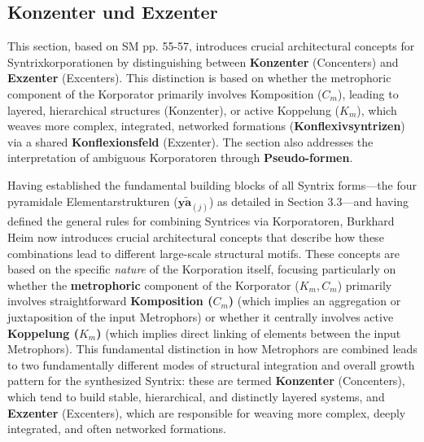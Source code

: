 \documentclass[12pt]{article}
\newcommand{\elementarstruktur}{\bm{y\widetilde{a}}_{(j)}}
\begin{document}
\subsection{Konzenter und Exzenter}
\label{sec:konzenter_exzenter}

This section, based on SM pp. 55-57, introduces crucial architectural concepts for Syntrixkorporationen by distinguishing between \textbf{Konzenter} (Concenters) and \textbf{Exzenter} (Excenters). This distinction is based on whether the metrophoric component of the Korporator primarily involves Komposition (\(C_m\)), leading to layered, hierarchical structures (Konzenter), or active Koppelung (\(K_m\)), which weaves more complex, integrated, networked formations (\textbf{Konflexivsyntrizen}) via a shared \textbf{Konflexionsfeld} (Exzenter). The section also addresses the interpretation of ambiguous Korporatoren through \textbf{Pseudo-formen}.

Having established the fundamental building blocks of all Syntrix forms—the four pyramidale Elementarstrukturen (\(\elementarstruktur\)) as detailed in Section 3.3—and having defined the general rules for combining Syntrices via Korporatoren, Burkhard Heim now introduces crucial architectural concepts that describe how these combinations lead to different large-scale structural motifs. These concepts are based on the specific \textit{nature} of the Korporation itself, focusing particularly on whether the \textbf{metrophoric} component of the Korporator (\(K_m, C_m\)) primarily involves straightforward \textbf{Komposition (\( C_m \))} (which implies an aggregation or juxtaposition of the input Metrophors) or whether it centrally involves active \textbf{Koppelung (\( K_m \))} (which implies direct linking of elements between the input Metrophors). This fundamental distinction in how Metrophors are combined leads to two fundamentally different modes of structural integration and overall growth pattern for the synthesized Syntrix: these are termed \textbf{Konzenter} (Concenters), which tend to build stable, hierarchical, and distinctly layered systems, and \textbf{Exzenter} (Excenters), which are responsible for weaving more complex, deeply integrated, and often networked formations.
\end{document}
